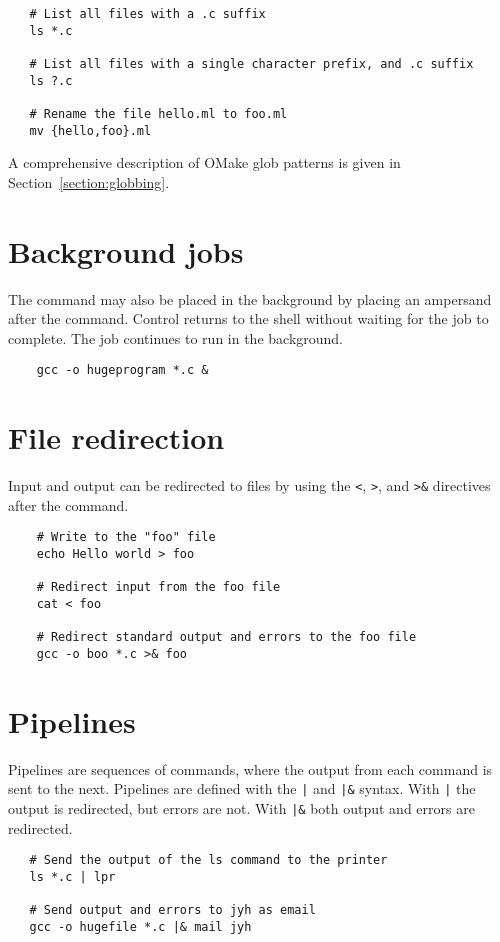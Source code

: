 \begin{verbatim}
   # List all files with a .c suffix
   ls *.c

   # List all files with a single character prefix, and .c suffix
   ls ?.c

   # Rename the file hello.ml to foo.ml
   mv {hello,foo}.ml
\end{verbatim}

A comprehensive description of OMake glob patterns is given in Section~\ref{section:globbing}.

\section{Background jobs}

The command may also be placed in the background by placing an ampersand after the command.  Control
returns to the shell without waiting for the job to complete.  The job continues to run in the
background.

\begin{verbatim}
    gcc -o hugeprogram *.c &
\end{verbatim}

\section{File redirection}

Input and output can be redirected to files by using the \verb+<+, \verb+>+, and \verb+>&+
directives after the command.

\begin{verbatim}
    # Write to the "foo" file
    echo Hello world > foo

    # Redirect input from the foo file
    cat < foo

    # Redirect standard output and errors to the foo file
    gcc -o boo *.c >& foo
\end{verbatim}

\section{Pipelines}

Pipelines are sequences of commands, where the output from each command is sent to the next.
Pipelines are defined with the \verb+|+ and \verb+|&+ syntax.  With \verb+|+ the output is
redirected, but errors are not.  With \verb+|&+ both output and errors are redirected.

\begin{verbatim}
   # Send the output of the ls command to the printer
   ls *.c | lpr

   # Send output and errors to jyh as email
   gcc -o hugefile *.c |& mail jyh
\end{verbatim}

